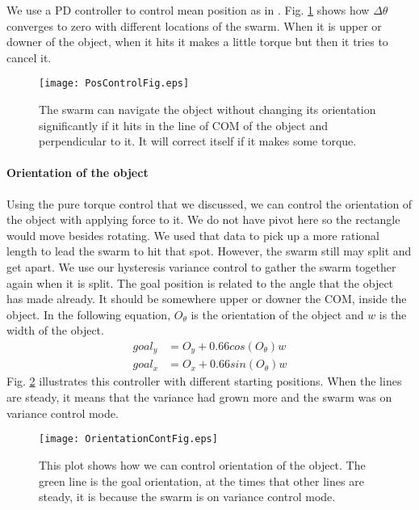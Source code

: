 We use a PD controller to control mean position as in \cite{ShahrokhiIROS2015}. Fig. \ref{fig:PosControlFig} shows how $\Delta \theta$ converges to zero with different locations of the swarm. When it is upper or downer of the object, when it hits it makes a little torque but then it tries to cancel it.
\begin{figure}
\begin{center}
	\texttt{[image: PosControlFig.eps]}
\end{center}
\vspace{-1em}
\caption{\label{fig:PosControlFig}
The swarm can navigate the object without changing its orientation significantly if it hits in the line of COM of the object and perpendicular to it. It will correct itself if it makes some torque.
}
\vspace{-1em}
\end{figure}

\paragraph{Orientation of the object}
Using the pure torque control that we discussed, we can control the orientation of the object with applying force to it. We do not have pivot here so the rectangle would move besides rotating. We used that data to pick up a more rational length to lead the swarm to hit that spot. However, the swarm still may split and get apart. We use our hysteresis variance control to gather the swarm together again when it is split. The goal position is related to the angle that the object has made already. It should be somewhere upper or downer the COM, inside the object. In the following equation, $O_{\theta}$ is the orientation of the object and $w$ is the width of the object.
\begin{align}\nonumber
goal_y &= O_y + 0.66cos(O_{\theta})w\\
goal_x &= O_x + 0.66sin(O_{\theta})w
\end{align}
Fig. \ref{fig:OrientCont} illustrates this controller with different starting positions. When the lines are steady, it means that the variance had grown more and the swarm was on variance control mode.
\begin{figure}
\begin{center}
	\texttt{[image: OrientationContFig.eps]}
\end{center}
\vspace{-1em}
\caption{\label{fig:OrientCont}
This plot shows how we can control orientation of the object. The green line is the goal orientation, at the times that other lines are steady, it is because the swarm is on variance control mode.
}
\vspace{-1em}
\end{figure}


